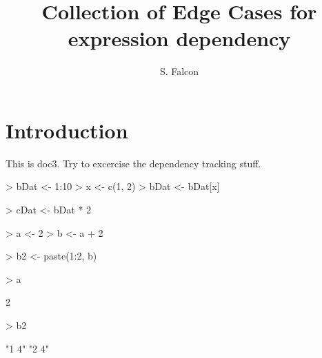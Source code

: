 \documentclass[11pt]{article}
\title{Collection of Edge Cases for expression dependency}
\author{S. Falcon}
\begin{document}
\maketitle

\section{Introduction}

This is doc3.  Try to excercise the dependency tracking stuff.

\begin{Schunk}
\begin{Sinput}
> bDat <- 1:10
> x <- c(1, 2)
> bDat <- bDat[x]
\end{Sinput}
\end{Schunk}

\begin{Schunk}
\begin{Sinput}
> cDat <- bDat * 2
\end{Sinput}
\end{Schunk}

\begin{Schunk}
\begin{Sinput}
> a <- 2
> b <- a + 2
\end{Sinput}
\end{Schunk}

\begin{Schunk}
\begin{Sinput}
> b2 <- paste(1:2, b)
\end{Sinput}
\end{Schunk}

\begin{Schunk}
\begin{Sinput}
> a
\end{Sinput}
\begin{Soutput}
[1] 2
\end{Soutput}
\begin{Sinput}
> b2
\end{Sinput}
\begin{Soutput}
[1] "1 4" "2 4"
\end{Soutput}
\end{Schunk}
\end{document}
